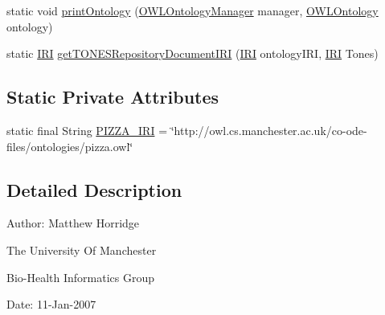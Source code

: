 \begin{DoxyCompactItemize}
\item 
static void \hyperlink{classorg_1_1coode_1_1owlapi_1_1examples_1_1_examples_aa17f6ddc5f3fc34694efe26a1ae242a8}{print\-Ontology} (\hyperlink{interfaceorg_1_1semanticweb_1_1owlapi_1_1model_1_1_o_w_l_ontology_manager}{O\-W\-L\-Ontology\-Manager} manager, \hyperlink{interfaceorg_1_1semanticweb_1_1owlapi_1_1model_1_1_o_w_l_ontology}{O\-W\-L\-Ontology} ontology)
\item 
static \hyperlink{classorg_1_1semanticweb_1_1owlapi_1_1model_1_1_i_r_i}{I\-R\-I} \hyperlink{classorg_1_1coode_1_1owlapi_1_1examples_1_1_examples_a230b032e1a4545d2d6230dc565df749b}{get\-T\-O\-N\-E\-S\-Repository\-Document\-I\-R\-I} (\hyperlink{classorg_1_1semanticweb_1_1owlapi_1_1model_1_1_i_r_i}{I\-R\-I} ontology\-I\-R\-I, \hyperlink{classorg_1_1semanticweb_1_1owlapi_1_1model_1_1_i_r_i}{I\-R\-I} Tones)
\end{DoxyCompactItemize}
\subsection*{Static Private Attributes}
\begin{DoxyCompactItemize}
\item 
static final String \hyperlink{classorg_1_1coode_1_1owlapi_1_1examples_1_1_examples_a26fe272de485064f25c77d7e3dc37115}{P\-I\-Z\-Z\-A\-\_\-\-I\-R\-I} = \char`\"{}http\-://owl.\-cs.\-manchester.\-ac.\-uk/co-\/ode-\/files/ontologies/pizza.\-owl\char`\"{}
\end{DoxyCompactItemize}


\subsection{Detailed Description}
Author\-: Matthew Horridge\par
 The University Of Manchester\par
 Bio-\/\-Health Informatics Group\par
 Date\-: 11-\/\-Jan-\/2007 

